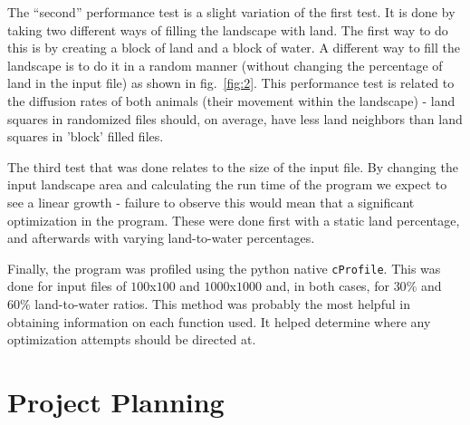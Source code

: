 \documentclass[12pt,a4paper]{article}
\begin{document}
The ``second'' performance test is a slight variation of the first test. It is 
done by taking two different ways of filling the landscape with land. The first 
way to do this is by creating a block of land and a block of water. A different 
way to fill the landscape is to do it in a random manner (without changing the 
percentage of land in the input file) as shown in fig.~\ref{fig:2}. This 
performance test is related to the diffusion rates of both animals (their 
movement within the landscape) - land 
squares in randomized files should, on average, have less land neighbors than 
land squares in 'block' filled files. 

The third test that was done relates to the size of the input file. By changing 
the input landscape area and calculating the run time of the program we expect 
to see a linear growth - failure to observe this would mean that a significant 
optimization in the program. These were done first with a static land 
percentage, and afterwards with varying land-to-water percentages.

Finally, the program was profiled using the python native \texttt{cProfile}. 
This was done for input files of $100$x$100$ and $1000$x$1000$ and, in both 
cases, for $30\%$ and $60\%$ land-to-water ratios. This method was probably the 
most helpful in obtaining information on each function used. It helped 
determine where any optimization attempts should be directed at.

\section{Project Planning}
\end{document}
